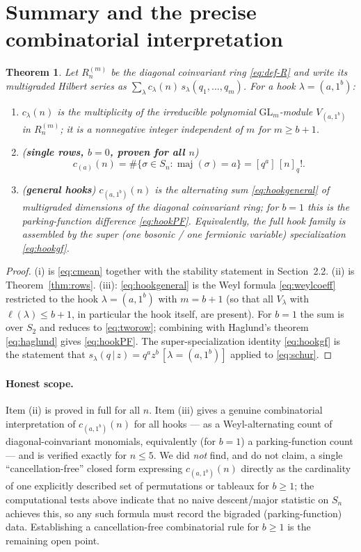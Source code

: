 \documentclass[11pt]{article}
\newtheorem{theorem}{Theorem}
\theoremstyle{definition}
\theoremstyle{remark}
\newcommand{\maj}{\operatorname{maj}}
\newcommand{\GL}{\mathrm{GL}}
\begin{document}
\section{Summary and the precise combinatorial interpretation}

\begin{theorem}\label{thm:main}
Let $R_n^{(m)}$ be the diagonal coinvariant ring \eqref{eq:def-R} and write its multigraded
Hilbert series as $\sum_\lambda c_\lambda(n)\,s_\lambda(q_1,\dots,q_m)$.  For a hook
$\lambda=(a,1^{b})$:
\begin{enumerate}
\item[(i)] $c_\lambda(n)$ is the multiplicity of the irreducible polynomial $\GL_m$-module
$V_{(a,1^b)}$ in $R_n^{(m)}$; it is a nonnegative integer independent of $m$ for $m\ge b+1$.
\item[(ii)] (\textbf{single rows, $b=0$, proven for all $n$})
\[
c_{(a)}(n)=\#\{\sigma\in S_n:\maj(\sigma)=a\}=[q^a]\,[n]_q!.
\]
\item[(iii)] (\textbf{general hooks}) $c_{(a,1^b)}(n)$ is the alternating sum
\eqref{eq:hookgeneral} of multigraded dimensions of the diagonal coinvariant ring; for $b=1$
this is the parking-function difference \eqref{eq:hookPF}.  Equivalently, the full hook family
is assembled by the super (one bosonic / one fermionic variable) specialization
\eqref{eq:hookgf}.
\end{enumerate}
\end{theorem}

\begin{proof}
(i) is \eqref{eq:cmean} together with the stability statement in Section~2.2.
(ii) is Theorem~\ref{thm:rows}.
(iii): \eqref{eq:hookgeneral} is the Weyl formula \eqref{eq:weylcoeff} restricted to the hook
$\lambda=(a,1^{b})$ with $m=b+1$ (so that all $V_\lambda$ with $\ell(\lambda)\le b+1$, in
particular the hook itself, are present).  For $b=1$ the sum is over $S_2$ and reduces to
\eqref{eq:tworow}; combining with Haglund's theorem \eqref{eq:haglund} gives \eqref{eq:hookPF}.
The super-specialization identity \eqref{eq:hookgf} is the statement that
$s_\lambda(q\,|\,z)=q^{a}z^{b}\,[\lambda=(a,1^{b})]$ applied to \eqref{eq:schur}.
\end{proof}

\paragraph{Honest scope.}
Item (ii) is proved in full for all $n$.  Item (iii) gives a genuine combinatorial
interpretation of $c_{(a,1^{b})}(n)$ for all hooks --- as a Weyl-alternating count of
diagonal-coinvariant monomials, equivalently (for $b=1$) a parking-function count --- and is
verified exactly for $n\le 5$.  We did \emph{not} find, and do not claim, a single
``cancellation-free'' closed form expressing $c_{(a,1^{b})}(n)$ directly as the cardinality of
one explicitly described set of permutations or tableaux for $b\ge 1$; the computational tests
above indicate that no naive descent/major statistic on $S_n$ achieves this, so any such
formula must record the bigraded (parking-function) data.  Establishing a cancellation-free
combinatorial rule for $b\ge 1$ is the remaining open point.
\end{document}

